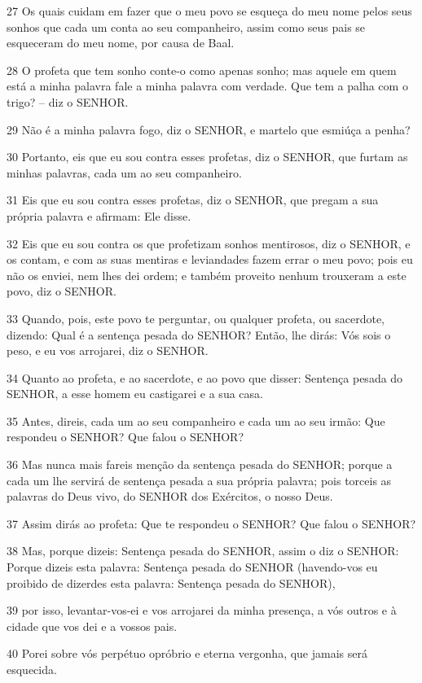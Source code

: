 \par 27 Os quais cuidam em fazer que o meu povo se esqueça do meu nome pelos seus sonhos que cada um conta ao seu companheiro, assim como seus pais se esqueceram do meu nome, por causa de Baal.
\par 28 O profeta que tem sonho conte-o como apenas sonho; mas aquele em quem está a minha palavra fale a minha palavra com verdade. Que tem a palha com o trigo? -- diz o SENHOR.
\par 29 Não é a minha palavra fogo, diz o SENHOR, e martelo que esmiúça a penha?
\par 30 Portanto, eis que eu sou contra esses profetas, diz o SENHOR, que furtam as minhas palavras, cada um ao seu companheiro.
\par 31 Eis que eu sou contra esses profetas, diz o SENHOR, que pregam a sua própria palavra e afirmam: Ele disse.
\par 32 Eis que eu sou contra os que profetizam sonhos mentirosos, diz o SENHOR, e os contam, e com as suas mentiras e leviandades fazem errar o meu povo; pois eu não os enviei, nem lhes dei ordem; e também proveito nenhum trouxeram a este povo, diz o SENHOR.
\par 33 Quando, pois, este povo te perguntar, ou qualquer profeta, ou sacerdote, dizendo: Qual é a sentença pesada do SENHOR? Então, lhe dirás: Vós sois o peso, e eu vos arrojarei, diz o SENHOR.
\par 34 Quanto ao profeta, e ao sacerdote, e ao povo que disser: Sentença pesada do SENHOR, a esse homem eu castigarei e a sua casa.
\par 35 Antes, direis, cada um ao seu companheiro e cada um ao seu irmão: Que respondeu o SENHOR? Que falou o SENHOR?
\par 36 Mas nunca mais fareis menção da sentença pesada do SENHOR; porque a cada um lhe servirá de sentença pesada a sua própria palavra; pois torceis as palavras do Deus vivo, do SENHOR dos Exércitos, o nosso Deus.
\par 37 Assim dirás ao profeta: Que te respondeu o SENHOR? Que falou o SENHOR?
\par 38 Mas, porque dizeis: Sentença pesada do SENHOR, assim o diz o SENHOR: Porque dizeis esta palavra: Sentença pesada do SENHOR (havendo-vos eu proibido de dizerdes esta palavra: Sentença pesada do SENHOR),
\par 39 por isso, levantar-vos-ei e vos arrojarei da minha presença, a vós outros e à cidade que vos dei e a vossos pais.
\par 40 Porei sobre vós perpétuo opróbrio e eterna vergonha, que jamais será esquecida.

